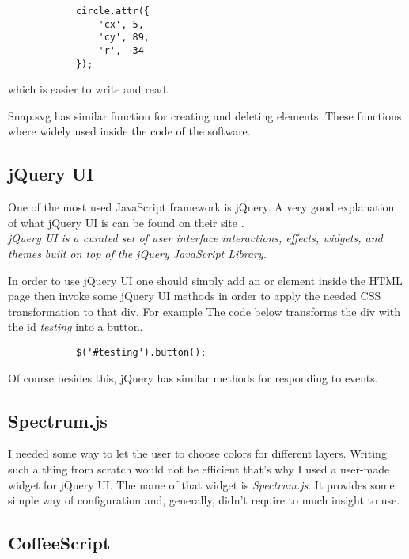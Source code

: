             \begin{lstlisting}
            circle.attr({
                'cx', 5,
                'cy', 89,
                'r',  34
            });
            \end{lstlisting}
            which is easier to write and read. 

            Snap.svg has similar function for creating and deleting elements. These functions where widely used inside the code of the software.

        \subsection{jQuery UI}
            One of the most used JavaScript framework is jQuery. A very good explanation of what jQuery UI is can be found on their site \cite{jquery}. \\
            \emph{jQuery UI is a curated set of user interface interactions, effects, widgets, and themes built on top of the jQuery JavaScript Library.}

            In order to use jQuery UI one should simply add an  or  element inside the HTML page then invoke some jQuery UI methods in order to apply the needed CSS transformation to that div. For example The code below transforms the div with the id \emph{testing} into a button.
            \begin{lstlisting}
            $('#testing').button();
            \end{lstlisting}

            Of course besides this, jQuery has similar methods for responding to events.

        \subsection{Spectrum.js}

            I needed some way to let the user to choose colors for different layers. 
            Writing such a thing from scratch would not be efficient that's why I used a user-made widget for jQuery UI. 
            The name of that widget is \emph{Spectrum.js}. 
            It provides some simple way of configuration and, generally, didn't require to much insight to use. 

        \subsection{CoffeeScript}

